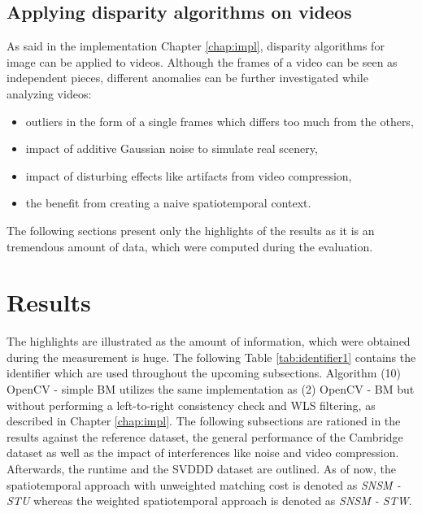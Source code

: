 \subsection*{Applying disparity algorithms on videos}

As said in the implementation Chapter \ref{chap:impl}, disparity algorithms for image can be applied to videos.
Although the frames of a video can be seen as independent pieces, different anomalies can be further investigated while analyzing videos:

\begin{itemize}
  \item outliers in the form of a single frames which differs too much from the others,
  \item impact of additive Gaussian noise to simulate real scenery,
  \item impact of disturbing effects like artifacts from video compression,
  \item the benefit from creating a naive spatiotemporal context.
\end{itemize}

\noindent The following sections present only the highlights of the results as it is an tremendous amount of data, which were computed during the evaluation.

\section{Results}

The highlights are illustrated as the amount of information, which were obtained during the measurement is huge.
The following Table \ref{tab:identifier1} contains the identifier which are used throughout the upcoming subsections.
Algorithm (10) OpenCV - simple BM utilizes the same implementation as (2) OpenCV - BM but without performing a left-to-right consistency check and WLS filtering, as described in Chapter \ref{chap:impl}.
The following subsections are rationed in the results against the reference dataset, the general performance of the Cambridge dataset as well as the impact of interferences like noise and video compression.
Afterwards, the runtime and the SVDDD dataset are outlined.
As of now, the spatiotemporal approach with unweighted matching cost is denoted as \textit{SNSM - STU} whereas the weighted spatiotemporal approach is denoted as \textit{SNSM - STW}.

